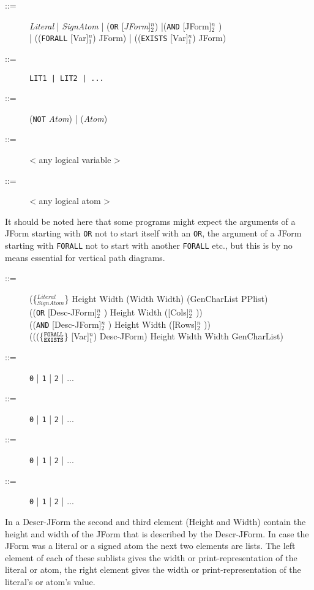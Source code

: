 \begin{description} %
\item [ ::=] {\it Literal} | {\it SignAtom} | ({\tt OR} [{\it JForm}]$^n_2$)
	|({\tt AND}  [JForm]$^n_2$ )
	\\ | (({\tt FORALL}  [Var]$_1^n$) JForm)
	| (({\tt EXISTS}  [Var]$_1^n$) JForm)

\item [ ::=] {\tt LIT1 | LIT2 | ...}

\item [ ::=] ({\tt NOT} {\it Atom}) | ({\it Atom})

\item [ ::=] < any logical variable >

\item [ ::=] < any logical atom >
\end{description}
It should be noted here that some programs might expect the arguments
of a JForm starting with {\tt OR} not to start itself with an {\tt OR},
the argument of a JForm starting with {\tt FORALL} not to start with another {\tt FORALL}
etc., but this is by no means essential for vertical path diagrams.

\begin{description}
\item [ ::=] (\{$^{Literal}_{SignAtom}$\} Height Width (Width Width) (GenCharList PPlist)
	\\ (({\tt OR} [Desc-JForm]$^n_2$ )
	 Height Width ([Cols]$^n_2$ ))
	\\ (({\tt AND} [Desc-JForm]$^n_2$ )
  	 Height Width ([Rows]$^n_2$ ))
	\\ (((\{$^{\tt FORALL}_{\tt EXISTS}$\} [Var]$^n_1$)
	 Desc-JForm) Height Width Width GenCharList)

\item [ ::=] {\tt 0} | {\tt 1} | {\tt 2} | ...

\item [ ::=] {\tt 0} | {\tt 1} | {\tt 2} | ...

\item [ ::=] {\tt 0} | {\tt 1} | {\tt 2} | ...

\item [ ::=] {\tt 0} | {\tt 1} | {\tt 2} | ...
\end{description}
In a Descr-JForm the second and third element (Height and Width) contain
the height and width of the JForm that is described by the Descr-JForm.
In case the JForm was a literal or a signed atom the next two elements
are lists. The left element of each of these sublists
gives the width or print-representation
of the literal or atom, the right element gives the width or print-representation
of the literal's or atom's value.

